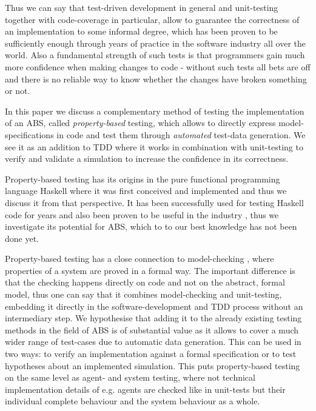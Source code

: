 
Thus we can say that test-driven development in general and unit-testing together with code-coverage in particular, allow to guarantee the correctness of an implementation to some informal degree, which has been proven to be sufficiently enough through years of practice in the software industry all over the world. Also a fundamental strength of such tests is that programmers gain much more confidence when making changes to code - without such tests all bets are off and there is no reliable way to know whether the changes have broken something or not.

In this paper we discuss a complementary method of testing the implementation of an ABS, called \textit{property-based} testing, which allows to directly express model-specifications in code and test them through \textit{automated} test-data generation. We see it as an addition to TDD where it works in combination with unit-testing to verify and validate a simulation to increase the confidence in its correctness.

Property-based testing has its origins \cite{claessen_quickcheck:_2000, claessen_testing_2002, runciman_smallcheck_2008} in the pure functional programming language Haskell \cite{hudak_history_2007} where it was first conceived and implemented and thus we discuss it from that perspective. It has been successfully used for testing Haskell code for years and also been proven to be useful in the industry \cite{hughes_quickcheck_2007}, thus we investigate its potential for ABS, which to to our best knowledge has not been done yet. 

Property-based testing has a close connection to model-checking \cite{mcmillan_symbolic_1993}, where properties of a system are proved in a formal way. The important difference is that the checking happens directly on code and not on the abstract, formal model, thus one can say that it combines model-checking and unit-testing, embedding it directly in the software-development and TDD process without an intermediary step. We hypothesise that adding it to the already existing testing methods in the field of ABS is of substantial value as it allows to cover a much wider range of test-cases due to automatic data generation. This can be used in two ways: to verify an implementation against a formal specification or to test hypotheses about an implemented simulation. This puts property-based testing on the same level as agent- and system testing, where not technical implementation details of e.g. agents are checked like in unit-tests but their individual complete behaviour and the system behaviour as a whole.


